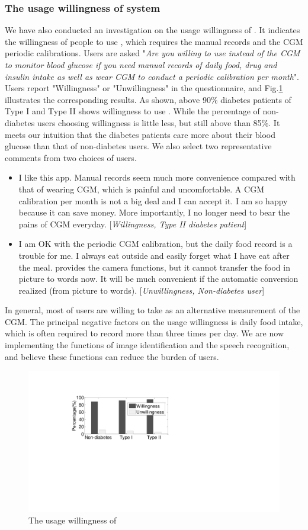 {\subsubsection{The usage willingness of system}
We have also conducted an investigation on the usage willingness of \sysname. It indicates the willingness of people to use \sysname, which requires the manual records and the CGM periodic calibrations.
Users are asked "\emph{Are you willing to use \sysname instead of the CGM to monitor blood glucose if you need manual records of daily food, drug and insulin intake as well as wear CGM to conduct a periodic calibration per month}". Users report "Willingness" or "Unwillingness" in the  questionnaire, and Fig.\ref{fig:user_willingness} illustrates the corresponding results. As shown,  above 90\% diabetes patients of Type I and Type II shows willingness to use \sysname. While the percentage of non-diabetes users choosing willingness is little less, but still above than 85\%. It meets our intuition that the diabetes patients care more about their blood glucose than that of non-diabetes users.
We also select two representative comments from two choices of users.

\begin{itemize}
  \item I like this app.  Manual records seem much more convenience compared with that of wearing CGM, which is painful and uncomfortable. A CGM calibration per month is not a big deal and I can accept it. I am so happy because it can save money. More importantly, I no longer need to bear the pains of CGM everyday. [\emph{Willingness, Type II diabetes patient}]
  \item I am OK with the periodic CGM calibration, but the daily food record is a trouble for me. I always eat outside and easily forget what I have eat after the meal. \sysname provides the camera functions, but it cannot transfer the food in picture to words now. It will be much convenient if the automatic conversion realized (from picture to words). [\emph{Unwillingness, Non-diabetes user}]
\end{itemize}

In general, most of users are willing to take \sysname as an alternative measurement of the CGM. The principal negative factors on the usage willingness is daily food intake, which is often required to record more than three times per day. We are now implementing the functions of image identification and the speech recognition, and believe these functions can reduce the burden of users.

\begin{figure}[h]
  \centering
  \includegraphics[width=0.5\columnwidth]{./img/willingness.pdf}
  \caption{The usage willingness of \sysname}
  \label{fig:user_willingness}
\end{figure}


}
